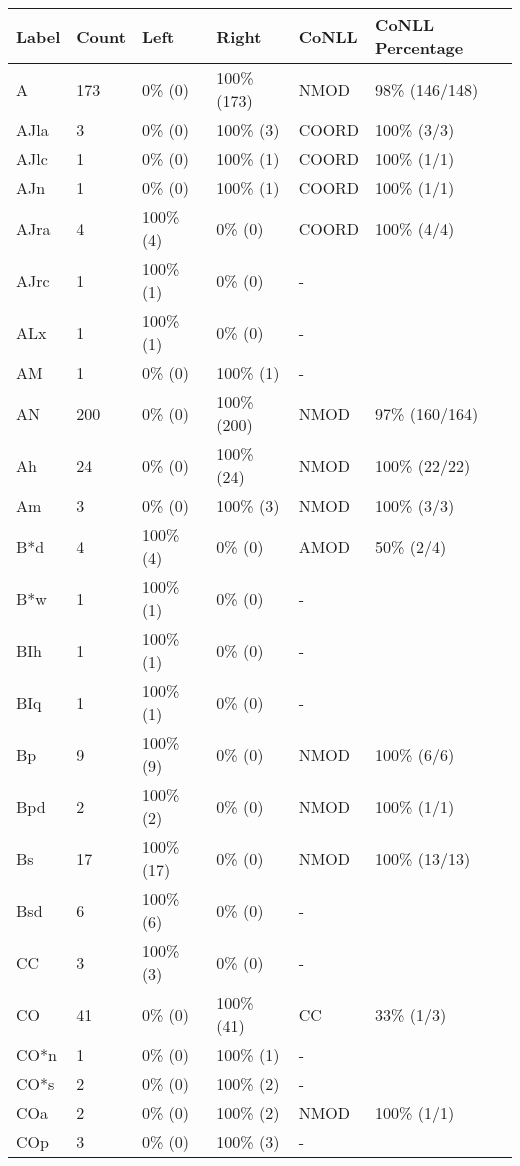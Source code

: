 \begin{figure*}
\begin{tabular}{|l|l|l|l||l|l|}
\hline
Label & Count & Left & Right & CoNLL & CoNLL Percentage\\ 
\hline
 A & 173 & 0\% (0) & 100\% (173) & NMOD & 98\% (146/148) \\ 
\hline
 AJla & 3 & 0\% (0) & 100\% (3) & COORD & 100\% (3/3) \\ 
\hline
 AJlc & 1 & 0\% (0) & 100\% (1) & COORD & 100\% (1/1) \\ 
\hline
 AJn & 1 & 0\% (0) & 100\% (1) & COORD & 100\% (1/1) \\ 
\hline
 AJra & 4 & 100\% (4) & 0\% (0) & COORD & 100\% (4/4) \\ 
\hline
 AJrc & 1 & 100\% (1) & 0\% (0) & - &  \\ 
\hline
 ALx & 1 & 100\% (1) & 0\% (0) & - &  \\ 
\hline
 AM & 1 & 0\% (0) & 100\% (1) & - &  \\ 
\hline
 AN & 200 & 0\% (0) & 100\% (200) & NMOD & 97\% (160/164) \\ 
\hline
 Ah & 24 & 0\% (0) & 100\% (24) & NMOD & 100\% (22/22) \\ 
\hline
 Am & 3 & 0\% (0) & 100\% (3) & NMOD & 100\% (3/3) \\ 
\hline
 B*d & 4 & 100\% (4) & 0\% (0) & AMOD & 50\% (2/4) \\ 
\hline
 B*w & 1 & 100\% (1) & 0\% (0) & - &  \\ 
\hline
 BIh & 1 & 100\% (1) & 0\% (0) & - &  \\ 
\hline
 BIq & 1 & 100\% (1) & 0\% (0) & - &  \\ 
\hline
 Bp & 9 & 100\% (9) & 0\% (0) & NMOD & 100\% (6/6) \\ 
\hline
 Bpd & 2 & 100\% (2) & 0\% (0) & NMOD & 100\% (1/1) \\ 
\hline
 Bs & 17 & 100\% (17) & 0\% (0) & NMOD & 100\% (13/13) \\ 
\hline
 Bsd & 6 & 100\% (6) & 0\% (0) & - &  \\ 
\hline
 CC & 3 & 100\% (3) & 0\% (0) & - &  \\ 
\hline
 CO & 41 & 0\% (0) & 100\% (41) & CC & 33\% (1/3) \\ 
\hline
 CO*n & 1 & 0\% (0) & 100\% (1) & - &  \\ 
\hline
 CO*s & 2 & 0\% (0) & 100\% (2) & - &  \\ 
\hline
 COa & 2 & 0\% (0) & 100\% (2) & NMOD & 100\% (1/1) \\ 
\hline
 COp & 3 & 0\% (0) & 100\% (3) & - &  \\ 

\end{tabular}
\end{figure*}
